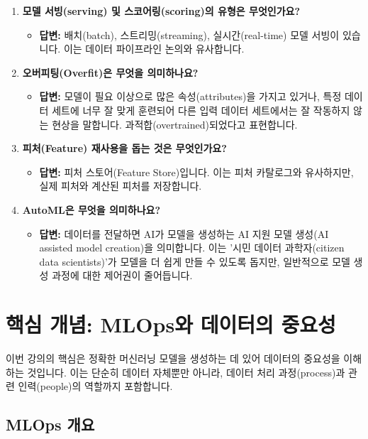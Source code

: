 \documentclass[11pt,a4paper]{article}
\theoremstyle{definition}
\begin{document}
\begin{enumerate}
    \item \textbf{모델 서빙(serving) 및 스코어링(scoring)의 유형은 무엇인가요?}
    \begin{itemize}
        \item \textbf{답변:} 배치(batch), 스트리밍(streaming), 실시간(real-time) 모델 서빙이 있습니다. 이는 데이터 파이프라인 논의와 유사합니다.
    \end{itemize}

    \item \textbf{오버피팅(Overfit)은 무엇을 의미하나요?}
    \begin{itemize}
        \item \textbf{답변:} 모델이 필요 이상으로 많은 속성(attributes)을 가지고 있거나, 특정 데이터 세트에 너무 잘 맞게 훈련되어 다른 입력 데이터 세트에서는 잘 작동하지 않는 현상을 말합니다. 과적합(overtrained)되었다고 표현합니다.
    \end{itemize}

    \item \textbf{피처(Feature) 재사용을 돕는 것은 무엇인가요?}
    \begin{itemize}
        \item \textbf{답변:} 피처 스토어(Feature Store)입니다. 이는 피처 카탈로그와 유사하지만, 실제 피처와 계산된 피처를 저장합니다.
    \end{itemize}

    \item \textbf{AutoML은 무엇을 의미하나요?}
    \begin{itemize}
        \item \textbf{답변:} 데이터를 전달하면 AI가 모델을 생성하는 AI 지원 모델 생성(AI assisted model creation)을 의미합니다. 이는 '시민 데이터 과학자(citizen data scientists)'가 모델을 더 쉽게 만들 수 있도록 돕지만, 일반적으로 모델 생성 과정에 대한 제어권이 줄어듭니다.
    \end{itemize}
\end{enumerate}

\newpage
\section{핵심 개념: MLOps와 데이터의 중요성}

이번 강의의 핵심은 정확한 머신러닝 모델을 생성하는 데 있어 데이터의 중요성을 이해하는 것입니다. 이는 단순히 데이터 자체뿐만 아니라, 데이터 처리 과정(process)과 관련 인력(people)의 역할까지 포함합니다.

\subsection{MLOps 개요}
\end{document}
